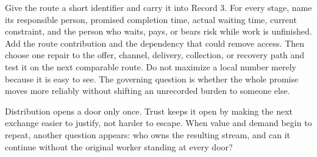 Give the route a short identifier and carry it into Record 3. For every stage,
name its responsible person, promised completion time, actual waiting time,
current constraint, and the person who waits, pays, or bears risk while work is
unfinished. Add the route contribution and the dependency that could remove
access. Then choose one repair to the offer, channel, delivery, collection, or
recovery path and test it on the next comparable route. Do not maximize a local
number merely because it is easy to see. The governing question is whether the
whole promise moves more reliably without shifting an unrecorded burden to
someone else.

Distribution opens a door only once. Trust keeps it open by making the next
exchange easier to justify, not harder to escape. When value and demand begin
to repeat, another question appears: who owns the resulting stream, and can it
continue without the original worker standing at every door?
